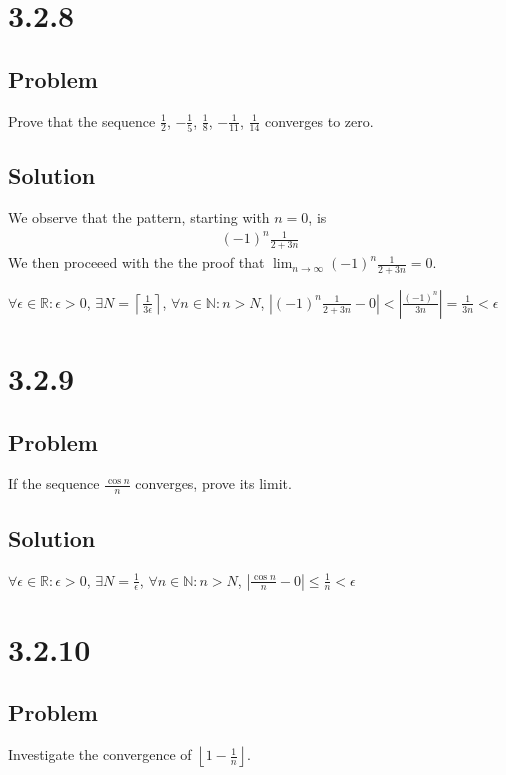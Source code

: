 \documentclass[12pt]{article}
\newcommand{\abs}  [1]{\left|       #1 \right|      }
\newcommand{\floor}[1]{\left\lfloor #1 \right\rfloor}
\newcommand{\ceil} [1]{\left\lceil  #1 \right\rceil }
\newcommand{\R}    [0]{\mathbb{R}                   }
\newcommand{\N}    [0]{\mathbb{N}                   }
\begin{document}
\section*{3.2.8}

\subsection*{Problem}
Prove that the sequence $\frac{1}{2}$, $-\frac{1}{5}$, $\frac{1}{8}$, $-\frac{1}{11}$, $\frac{1}{14}$ converges to zero.

\subsection*{Solution}
We observe that the pattern, starting with $n = 0$, is
\begin{align*}
    (-1)^n \frac{1}{2 + 3n}
\end{align*}
We then proceeed with the the proof that $\lim_{n \to \infty} (-1)^n \frac{1}{2 + 3n} = 0$.

$\forall \epsilon \in \R : \epsilon > 0$, $\exists N = \ceil{\frac{1}{3 \epsilon}}$, $\forall n \in \N : n > N$, $\abs{(-1)^n \frac{1}{2 + 3n} - 0} < \abs{\frac{(-1)^n}{3n}} = \frac{1}{3n} < \epsilon$



\section*{3.2.9}

\subsection*{Problem}
If the sequence $\frac{\cos n}{n}$ converges, prove its limit.

\subsection*{Solution}
$\forall \epsilon \in \R : \epsilon > 0$, $\exists N = \frac{1}{\epsilon}$, $\forall n \in \N : n > N$, $\abs{\frac{\cos n}{n} - 0} \leq \frac{1}{n} < \epsilon$



\section*{3.2.10}

\subsection*{Problem}
Investigate the convergence of $\floor{1 - \frac{1}{n}}$.
\end{document}

